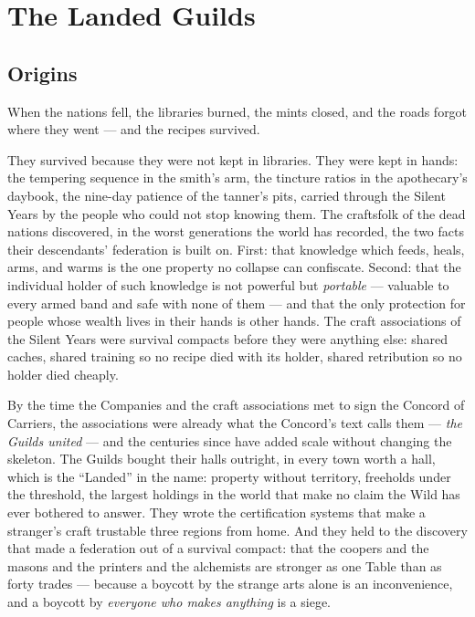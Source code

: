 \section{The Landed Guilds}

\subsection{Origins}

When the nations fell, the libraries burned, the mints closed, and the roads forgot where they went --- and the recipes survived.

They survived because they were not kept in libraries. They were kept in hands: the tempering sequence in the smith's arm, the tincture ratios in the apothecary's daybook, the nine-day patience of the tanner's pits, carried through the Silent Years by the people who could not stop knowing them. The craftsfolk of the dead nations discovered, in the worst generations the world has recorded, the two facts their descendants' federation is built on. First: that knowledge which feeds, heals, arms, and warms is the one property no collapse can confiscate. Second: that the individual holder of such knowledge is not powerful but \textit{portable} --- valuable to every armed band and safe with none of them --- and that the only protection for people whose wealth lives in their hands is other hands. The craft associations of the Silent Years were survival compacts before they were anything else: shared caches, shared training so no recipe died with its holder, shared retribution so no holder died cheaply.

By the time the Companies and the craft associations met to sign the Concord of Carriers, the associations were already what the Concord's text calls them --- \textit{the Guilds united} --- and the centuries since have added scale without changing the skeleton. The Guilds bought their halls outright, in every town worth a hall, which is the ``Landed'' in the name: property without territory, freeholds under the threshold, the largest holdings in the world that make no claim the Wild has ever bothered to answer. They wrote the certification systems that make a stranger's craft trustable three regions from home. And they held to the discovery that made a federation out of a survival compact: that the coopers and the masons and the printers and the alchemists are stronger as one Table than as forty trades --- because a boycott by the strange arts alone is an inconvenience, and a boycott by \textit{everyone who makes anything} is a siege.

